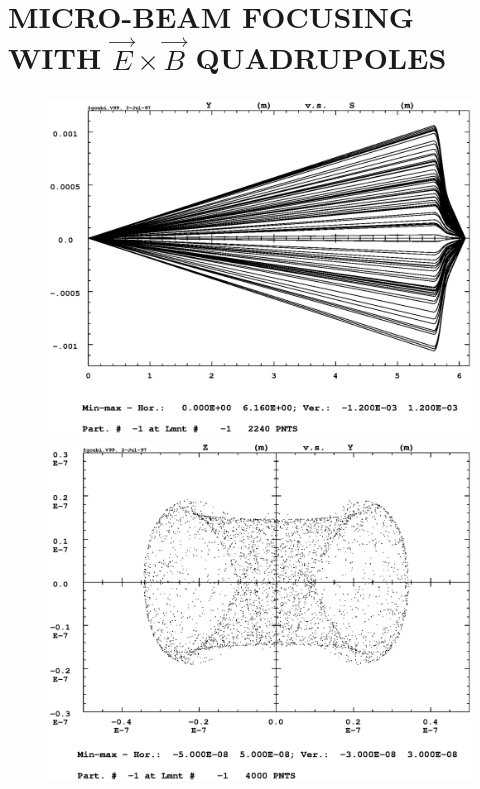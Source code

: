 \clearpage

\onecolumn



\section{MICRO-BEAM FOCUSING WITH $\vec E \times \vec B$ QUADRUPOLES}
\vfill

\begin{figure}[H]
  \centerline{\includegraphics[height=9cm]{FigC7-1.ps}}
  \centerline{\includegraphics[height=9cm]{FigC7-2.ps}}

\end{figure}
